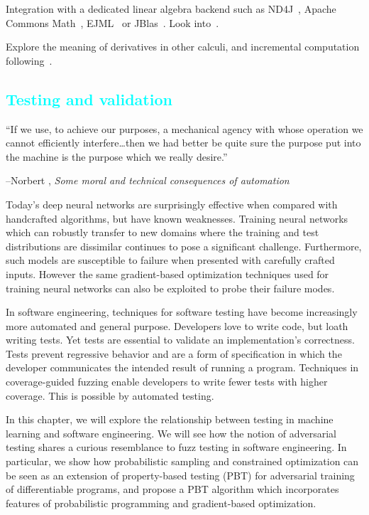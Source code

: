 \documentclass[12pt,initial,twoside,maitrise]{dms}
\newcommand{\medium}[1]{\textcolor{cyan}{#1}}
\numberwithin{equation}{section}
\numberwithin{table}{chapter}
\numberwithin{figure}{chapter}
\begin{document}
Integration with a dedicated linear algebra backend such as ND4J~\citep{team2016nd4j}, Apache Commons Math~\citep{developers2012apache}, EJML~\citep{abeles2010efficient} or JBlas~\citep{braun2011jblas}. Look into~\cite{makwana2018numlin}.

Explore the meaning of derivatives in other calculi, and incremental computation following~\citet{ehrhard2003differential, chen2012type, cai2014theory, kelly2016evolving}.

\medium{\chapter{Testing and validation}\label{ch:difftest}}

\setlength{\epigraphwidth}{0.80\textwidth}
\epigraph{``If we use, to achieve our purposes, a mechanical agency with whose operation we cannot efficiently interfere\ldots then we had better be quite sure the purpose put into the machine is the purpose which we really desire.''}{\begin{flushright}--Norbert \citet{wiener1960some}, \textit{Some moral and technical consequences of automation}~\end{flushright}}

Today's deep neural networks are surprisingly effective when compared with handcrafted algorithms, but have known weaknesses. Training neural networks which can robustly transfer to new domains where the training and test distributions are dissimilar continues to pose a significant challenge. Furthermore, such models are susceptible to failure when presented with carefully crafted inputs. However the same gradient-based optimization techniques used for training neural networks can also be exploited to probe their failure modes.

In software engineering, techniques for software testing have become increasingly more automated and general purpose. Developers love to write code, but loath writing tests. Yet tests are essential to validate an implementation's correctness. Tests prevent regressive behavior and are a form of specification in which the developer communicates the intended result of running a program. Techniques in coverage-guided fuzzing enable developers to write fewer tests with higher coverage. This is possible by automated testing.

In this chapter, we will explore the relationship between testing in machine learning and software engineering. We will see how the notion of adversarial testing shares a curious resemblance to fuzz testing in software engineering. In particular, we show how probabilistic sampling and constrained optimization can be seen as an extension of property-based testing (PBT) for adversarial training of differentiable programs, and propose a PBT algorithm which incorporates features of probabilistic programming and gradient-based optimization.
\end{document}
